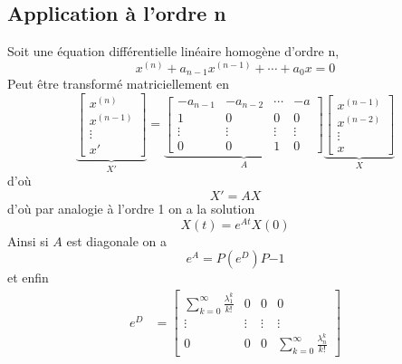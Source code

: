 \documentclass[11pt,colorlinks]{book}
\theoremstyle{mytheoremstyle}
\theoremstyle{mytheoremstyle}
\theoremstyle{mytheoremstyle}
\theoremstyle{mytheoremstyle}
\theoremstyle{mytheoremstyle}
\theoremstyle{mytheoremstyle}
\theoremstyle{mytheoremstyle}
\theoremstyle{mytheoremstyle}
\theoremstyle{myproblemstyle}
\begin{document}
\subsection{Application à l'ordre n}
\begin{definition}
  Soit une équation différentielle linéaire homogène d'ordre n,
  \begin{equation*}
    x^{(n)} + a_{n-1}x^{(n-1)} + \cdots + a_0 x = 0
  \end{equation*}
  Peut être transformé matriciellement en 
  \begin{equation*}
    \underbrace{\begin{bmatrix}
      x^(n) \\ 
      x^(n-1) \\
      \vdots \\ 
      x'
    \end{bmatrix}}_{X'} = 
    \underbrace{\begin{bmatrix}
      -a_{n-1} & -a_{n-2} & \cdots & - a \\ 
      1 & 0 & 0 & 0 \\ 
      \vdots & \vdots & \vdots & \vdots \\ 
      0 & 0 & 1 & 0
    \end{bmatrix}}_{A}
    \underbrace{\begin{bmatrix}
      x^(n-1) \\ 
      x^(n-2) \\ 
      \vdots \\ 
      x
    \end{bmatrix}}_{X}
  \end{equation*}
  d'où 
  \begin{equation*}
    X' = AX
  \end{equation*}
  d'où par analogie à l'ordre 1 on a la solution 
  \begin{equation*}
    X(t) = e^{At}X(0)
  \end{equation*}
  Ainsi si $A$ est diagonale on a 
  \begin{equation*}
    e^A = P(e^D)P{-1}
  \end{equation*}
  et enfin 
  \begin{align*}
    e^D &= \begin{bmatrix}
      \sum_{k=0}^{\infty} \frac{\lambda_1^k}{k!} & 0 & 0 & 0 \\ 
      \vdots & \vdots & \vdots & \vdots \\ 
      0 & 0 & 0 & \sum_{k=0}^{\infty} \frac{\lambda_n^k}{k!}
    \end{bmatrix} \\ 

\end{align*}
\end{definition}
\end{document}
